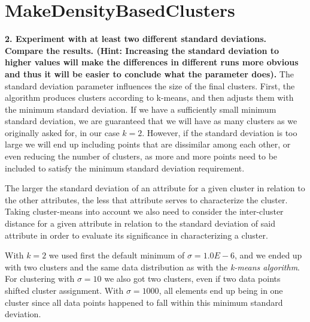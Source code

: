 \documentclass[]{article}
\begin{document}
\section{MakeDensityBasedClusters}
\textbf{2. Experiment with at least two different standard deviations. Compare the results. (Hint: Increasing the standard deviation to higher values will make the differences in different runs more obvious and thus it will be easier to conclude what the parameter does).} 
The standard deviation parameter influences the size of the final clusters. First, the algorithm produces clusters according to k-means, and then adjusts them with the minimum standard deviation. If we have a sufficiently small minimum standard deviation, we are guaranteed that we will have as many clusters as we originally asked for, in our case $k=2$. However, if the standard deviation is too large we will end up including points that are dissimilar among each other, or even reducing the number of clusters, as more and more points need to be included to satisfy the minimum standard deviation requirement.

The larger the standard deviation of an attribute for a given cluster in relation to the other attributes, the less that attribute serves to characterize the cluster. Taking cluster-means into account we also need to consider the inter-cluster distance for a given attribute in relation to the standard deviation of said attribute in order to evaluate its significance in characterizing a cluster.

With $k=2$ we used first the default minimum of $\sigma=1.0E-6$, and we ended up with two clusters and the same data distribution as with the \textit{k-means algorithm}. For clustering with $\sigma=10$ we also got two clusters, even if two data points shifted cluster assignment. With $\sigma=1000$, all elements end up being in one cluster since all data points happened to fall within this minimum standard deviation.
\end{document}
